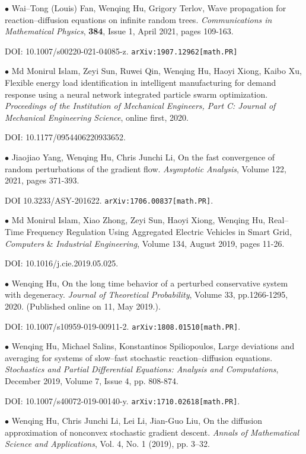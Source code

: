 \documentclass[margin,line]{res}
\begin{document}
\begin{resume}
$\bullet$ Wai--Tong (Louis) Fan, Wenqing Hu, Grigory Terlov, Wave propagation for reaction--diffusion equations on infinite random trees. \textit{Communications in Mathematical Physics}, \textbf{384}, Issue 1, April 2021, pages 109-163. 

DOI: 10.1007/s00220-021-04085-z. \verb"arXiv:1907.12962[math.PR]"

$\bullet$ Md Monirul Islam, Zeyi Sun, Ruwei Qin, Wenqing Hu, Haoyi Xiong, Kaibo Xu, Flexible energy load identification in intelligent manufacturing for demand response using a neural network integrated particle swarm optimization. \textit{Proceedings of the Institution of Mechanical Engineers, Part C: Journal of Mechanical Engineering Science}, online first, 2020.

DOI: 10.1177/0954406220933652. 

$\bullet$ Jiaojiao Yang, Wenqing Hu, Chris Junchi Li, On the fast convergence of random perturbations of the gradient flow. \textit{Asymptotic Analysis}, Volume 122, 2021, pages 371-393.

DOI 10.3233/ASY-201622. \verb"arXiv:1706.00837[math.PR]".

$\bullet$ Md Monirul Islam, Xiao Zhong, Zeyi Sun, Haoyi Xiong, Wenqing Hu, Real--Time Frequency Regulation Using Aggregated Electric Vehicles in Smart Grid, \textit{Computers} \& \textit{Industrial Engineering}, Volume 134, August 2019, pages 11-26.

DOI: 10.1016/j.cie.2019.05.025.


$\bullet$ Wenqing Hu, On the long time behavior of a perturbed conservative system with degeneracy.  
\textit{Journal of Theoretical Probability}, Volume 33, pp.1266-1295, 2020. (Published online on 11, May 2019.).

DOI: 10.1007/s10959-019-00911-2. \verb"arXiv:1808.01510[math.PR]".



$\bullet$ Wenqing Hu, Michael Salins, Konstantinos Spiliopoulos,
Large deviations and averaging for systems of slow--fast stochastic reaction--diffusion equations.
\textit{Stochastics and  Partial Differential Equations: Analysis and Computations}, December 2019, Volume 7, Issue 4, pp. 808-874.

DOI: 10.1007/s40072-019-00140-y. \verb"arXiv:1710.02618[math.PR]".


$\bullet$ Wenqing Hu, Chris Junchi Li, Lei Li, Jian-Guo Liu, On the diffusion approximation of nonconvex stochastic gradient descent.
\textit{Annals of Mathematical Science and Applications}, Vol. 4, No. 1 (2019), pp. 3--32.


\end{resume}
\end{document}
